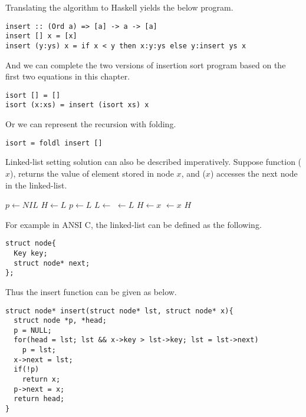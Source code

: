 \documentclass{article}
\begin{document}
Translating the algorithm to Haskell yields the below program.

\lstset{language=Haskell}
\begin{lstlisting}
insert :: (Ord a) => [a] -> a -> [a]
insert [] x = [x]
insert (y:ys) x = if x < y then x:y:ys else y:insert ys x
\end{lstlisting}

And we can complete the two versions of insertion sort program based on
the first two equations in this chapter.

\begin{lstlisting}
isort [] = []
isort (x:xs) = insert (isort xs) x
\end{lstlisting}

Or we can represent the recursion with folding.

\begin{lstlisting}
isort = foldl insert []
\end{lstlisting}

Linked-list setting solution can also be described imperatively. Suppose
function ($x$), returns the value of element stored in node
$x$, and ($x$) accesses the next node in the linked-list.

\begin{algorithmic}
  \State $p \gets NIL$
  \State $H \gets L$
    \State $p \gets L$
    \State $L \gets $ 
  \EndWhile
  \State {} $\gets L$
    \State $H \gets x$
  \Else
    \State {} $\gets x$
  \EndIf
  \State \Return $H$
\EndFunction
\end{algorithmic}

For example in ANSI C, the linked-list can be defined as the following.

\lstset{language=C}
\begin{lstlisting}
struct node{
  Key key;
  struct node* next;
};
\end{lstlisting}

Thus the insert function can be given as below.

\begin{lstlisting}
struct node* insert(struct node* lst, struct node* x){
  struct node *p, *head;
  p = NULL;
  for(head = lst; lst && x->key > lst->key; lst = lst->next)
    p = lst;
  x->next = lst;
  if(!p)
    return x;
  p->next = x;
  return head;
}
\end{lstlisting}
\end{document}
